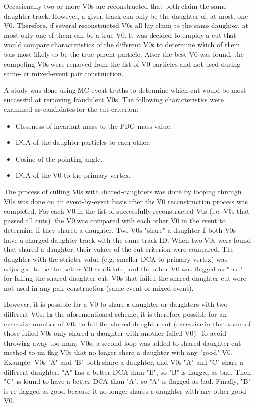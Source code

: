 Occasionally two or more V0s are reconstructed that both claim the same daughter track.  However, a given track can only be the daughter of, at most, one V0.  Therefore, if several reconstructed V0s all lay claim to the same daughter, at most only one of them can be a true V0.  It was decided to employ a cut that would compare characteristics of the different V0s to determine which of them was most likely to be the true parent particle.  After the best V0 was found, the competing V0s were removed from the list of V0 particles and not used during same- or mixed-event pair construction.

A study was done using MC event truths to determine which cut would be most successful at removing fraudulent V0s.  The following characteristics were examined as candidates for the cut criterion:

\begin{itemize}
\item Closeness of invariant mass to the PDG mass value.
\item DCA of the daughter particles to each other.
\item Cosine of the pointing angle.
\item DCA of the V0 to the primary vertex.
\end{itemize}

The process of culling V0s with shared-daughters was done by looping through V0s was done on an event-by-event basis after the V0 reconstruction process was completed.  For each V0 in the list of successfully reconstructed V0s (i.e. V0s that passed all cuts), the V0 was compared with each other V0 in the event to determine if they shared a daughter.  Two V0s "share" a daughter if both V0s have a charged daughter track with the same track ID.  When two V0s were found that shared a daughter, their values of the cut criterion were compared.  The daughter with the stricter value (e.g. smaller DCA to primary vertex) was adjudged to be the better V0 candidate, and the other V0 was flagged as "bad" for failing the shared-daughter cut.  V0s that failed the shared-daughter cut were not used in any pair construction (same event or mixed event).

However, it is possible for a V0 to share a daughter or daughters with two different V0s. In the aforementioned scheme, it is therefore possible for an excessive number of V0s to fail the shared daughter cut (excessive in that some of those failed V0s only shared a daughter with another failed V0).  To avoid throwing away too many V0s, a second loop was added to shared-daughter cut method to un-flag V0s that no longer share a daughter with any "good" V0. Example: V0s "A" and "B" both share a daughter, and V0s "A" and "C" share a different daughter.  "A" has a better DCA than "B", so "B" is flagged as bad.  Then "C" is found to have a better DCA than "A", so "A" is flagged as bad.  Finally, "B" is re-flagged as good because it no longer shares a daughter with any other good V0.

